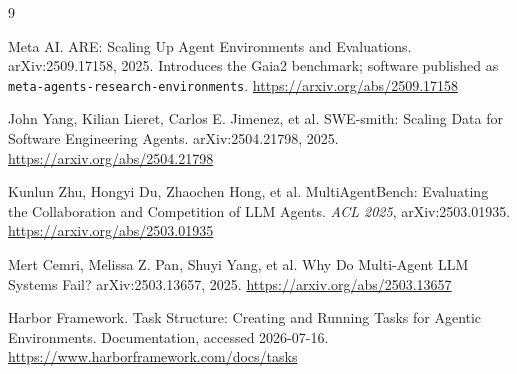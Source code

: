 \documentclass[11pt,a4paper]{article}
\begin{document}
\begingroup
\footnotesize
\begin{thebibliography}{9}
\setlength{\itemsep}{0.25em}
\setlength{\parskip}{0pt}

Meta AI.
\newblock ARE: Scaling Up Agent Environments and Evaluations.
\newblock arXiv:2509.17158, 2025. Introduces the Gaia2 benchmark; software published as \texttt{meta-agents-research-environments}.
\newblock \url{https://arxiv.org/abs/2509.17158}

John Yang, Kilian Lieret, Carlos E. Jimenez, et al.
\newblock SWE-smith: Scaling Data for Software Engineering Agents.
\newblock arXiv:2504.21798, 2025.
\newblock \url{https://arxiv.org/abs/2504.21798}

Kunlun Zhu, Hongyi Du, Zhaochen Hong, et al.
\newblock MultiAgentBench: Evaluating the Collaboration and Competition of LLM Agents.
\newblock \emph{ACL 2025}, arXiv:2503.01935.
\newblock \url{https://arxiv.org/abs/2503.01935}

Mert Cemri, Melissa Z. Pan, Shuyi Yang, et al.
\newblock Why Do Multi-Agent LLM Systems Fail?
\newblock arXiv:2503.13657, 2025.
\newblock \url{https://arxiv.org/abs/2503.13657}

Harbor Framework.
\newblock Task Structure: Creating and Running Tasks for Agentic Environments.
\newblock Documentation, accessed 2026-07-16.
\newblock \url{https://www.harborframework.com/docs/tasks}

\end{thebibliography}
\endgroup
\end{document}
